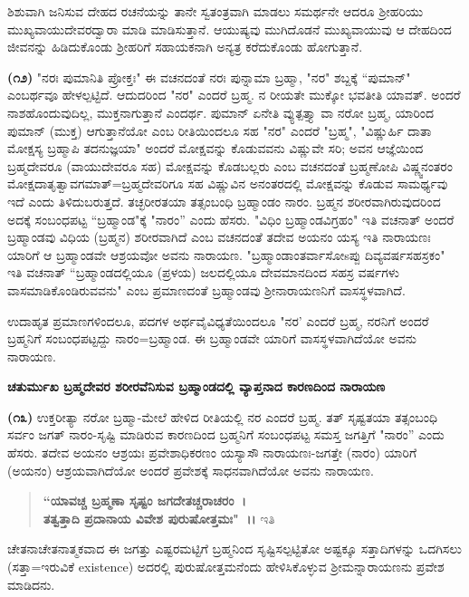 
\noindent
ಶಿಶುವಾಗಿ ಜನಿಸುವ ದೇಹದ ರಚನೆಯನ್ನು ತಾನೇ ಸ್ವತಂತ್ರವಾಗಿ ಮಾಡಲು ಸಮರ್ಥನೇ ಆದರೂ ಶ‍್ರೀಹರಿಯು ಮುಖ್ಯವಾಯುದೇವರದ್ವಾರಾ ಮಾಡಿ ಮಾಡಿಸುತ್ತಾನೆ. ಆಯುಷ್ಯವು ಮುಗಿದೊಡನೆ ಮುಖ್ಯವಾಯುವು ಆ ದೇಹದಿಂದ ಜೀವನನ್ನು ಹಿಡಿದುಕೊಂಡು ಶ‍್ರೀಹರಿಗೆ ಸಹಾಯಕನಾಗಿ ಅನ್ಯತ್ರ ಕರೆದುಕೊಂಡು ಹೋಗುತ್ತಾನೆ.

\textbf{(೧೨)} "ನರಃ ಪುಮಾನಿತಿ ಪ್ರೋಕ್ತಃ" ಈ ವಚನದಂತೆ ನರಃ ಪುನ್ನಾಮಾ ಬ್ರಹ್ಮಾ, "ನರ" ಶಬ್ದಕ್ಕೆ “ಪುಮಾನ್" ಎಂಬರ್ಥವೂ ಹೇಳಲ್ಪಟ್ಟಿದೆ. ಆದುದರಿಂದ "ನರ" ಎಂದರೆ ಬ್ರಹ್ಮ. ನ ರೀಯತೇ ಮುಕ್ಕೋ ಭವತೀತಿ ಯಾವತ್. ಅಂದರೆ ನಾಶಹೊಂದುವುದಿಲ್ಲ, ಮುಕ್ತನಾಗುತ್ತಾನೆ ಎಂದರ್ಥ. ಪುಮಾನ್ ಏನೇತಿ ವ್ಯುತ್ಪತ್ತ್ಯಾ ವಾ ನರೋ ಬ್ರಹ್ಮ, ಯಾರಿಂದ ಪುಮಾನ್ (ಮುಕ್ತ) ಆಗುತ್ತಾನೆಯೋ ಎಂಬ ರೀತಿಯಿಂದಲೂ ಸಹ "ನರ" ಎಂದರೆ "ಬ್ರಹ್ಮ", "ವಿಷ್ಣುರ್ಹಿ ದಾತಾ ಮೋಕ್ಷಸ್ಯ ಬ್ರಹ್ಮಾಪಿ ತದನುಜ್ಞಯಾ" ಅಂದರೆ ಮೋಕ್ಷವನ್ನು ಕೊಡುವವನು ವಿಷ್ಣುವೇ ಸರಿ; ಅವನ ಆಜ್ಞೆಯಿಂದ ಬ್ರಹ್ಮದೇವರೂ (ವಾಯುದೇವರೂ ಸಹ) ಮೋಕ್ಷವನ್ನು ಕೊಡಬಲ್ಲರು ಎಂಬ ವಚನದಂತೆ ಬ್ರಹ್ಮಣೋಪಿ ವಿಷ್ಣ್ವನಂತರಂ ಮೋಕ್ಷದಾತೃತ್ವಾವಗಮಾತ್=ಬ್ರಹ್ಮದೇವರಿಗೂ ಸಹ ವಿಷ್ಣುವಿನ ಅನಂತರದಲ್ಲಿ ಮೋಕ್ಷವನ್ನು ಕೊಡುವ ಸಾಮರ್ಥ್ಯವು ಇದೆ ಎಂದು ತಿಳಿದುಬರುತ್ತದೆ. ತಚ್ಛರೀರತಯಾ ತತ್ಸಂಬಂಧಿ ಬ್ರಹ್ಮಾಂಡಂ ನಾರಂ. ಬ್ರಹ್ಮನ ಶರೀರವಾಗಿರುವುದರಿಂದ ಅದಕ್ಕೆ ಸಂಬಂಧಪಟ್ಟ “ಬ್ರಹ್ಮಾಂಡ"ಕ್ಕೆ "ನಾರಂ'' ಎಂದು ಹೆಸರು. "ವಿಧಿಂ ಬ್ರಹ್ಮಾಂಡವಿಗ್ರಹಂ" ಇತಿ ವಚನಾತ್ ಅಂದರೆ ಬ್ರಹ್ಮಾಂಡವು ವಿಧಿಯ (ಬ್ರಹ್ಮನ) ಶರೀರವಾಗಿದೆ ಎಂಬ ವಚನದಂತೆ ತದೇವ ಅಯನಂ ಯಸ್ಯ ಇತಿ ನಾರಾಯಣಃ ಯಾರಿಗೆ ಆ ಬ್ರಹ್ಮಾಂಡವೇ ಆಶ್ರಯವೋ ಅವನು ನಾರಾಯಣ. "ಬ್ರಹ್ಮಾಂಡಾಂತ\-ರ್ವಾಸೋsಪ್ಪು ದಿವ್ಯವರ್ಷಸಹಸ್ರಕಂ" ಇತಿ ವಚನಾತ್ “ಬ್ರಹ್ಮಾಂಡದಲ್ಲಿಯೂ (ಪ್ರಳಯ) ಜಲದಲ್ಲಿಯೂ ದೇವಮಾನದಿಂದ ಸಹಸ್ರ ವರ್ಷಗಳು ವಾಸಮಾಡಿಕೊಂಡಿರುವವನು" ಎಂಬ ಪ್ರಮಾಣದಂತೆ ಬ್ರಹ್ಮಾಂಡವು ಶ‍್ರೀನಾರಾಯಣನಿಗೆ ವಾಸಸ್ಥಳವಾಗಿದೆ.

ಉದಾಹೃತ ಪ್ರಮಾಣಗಳಿಂದಲೂ, ಪದಗಳ ಅರ್ಥವೈವಿಧ್ಯತೆಯಿಂದಲೂ "ನರ' ಎಂದರೆ ಬ್ರಹ್ಮ, ನರನಿಗೆ ಅಂದರೆ ಬ್ರಹ್ಮನಿಗೆ ಸಂಬಂಧಪಟ್ಟದ್ದು ನಾರಂ=ಬ್ರಹ್ಮಾಂಡ. ಈ ಬ್ರಹ್ಮಾಂಡವೇ ಯಾರಿಗೆ ವಾಸಸ್ಥಳವಾಗಿದೆಯೋ ಅವನು ನಾರಾಯಣ.

\begin{center}
\textbf{ಚತುರ್ಮುಖ ಬ್ರಹ್ಮದೇವರ ಶರೀರವೆನಿಸುವ ಬ್ರಹ್ಮಾಂಡದಲ್ಲಿ ವ್ಯಾಪ್ತನಾದ ಕಾರಣದಿಂದ ನಾರಾಯಣ}
\end{center}

\textbf{(೧೩)} ಉಕ್ತರೀತ್ಯಾ ನರೋ ಬ್ರಹ್ಮಾ-ಮೇಲೆ ಹೇಳಿದ ರೀತಿಯಲ್ಲಿ ನರ ಎಂದರೆ ಬ್ರಹ್ಮ. ತತ್ ಸೃಷ್ಟತಯಾ ತತ್ಸಂಬಂಧಿ ಸರ್ವಂ ಜಗತ್ ನಾರಂ-ಸೃಷ್ಟಿ ಮಾಡಿರುವ ಕಾರಣದಿಂದ ಬ್ರಹ್ಮನಿಗೆ ಸಂಬಂಧಪಟ್ಟ ಸಮಸ್ತ ಜಗತ್ತಿಗೆ "ನಾರಂ'' ಎಂದು ಹೆಸರು. ತದೇವ ಅಯನಂ ಆಶ್ರಯಃ ಪ್ರವೇಶಾಧಿಕರಣಂ ಯಸ್ಯಾಸೌ ನಾರಾಯಣಃ-ಜಗತ್ತೇ (ನಾರಂ) ಯಾರಿಗೆ (ಅಯನಂ) ಆಶ್ರಯವಾಗಿದೆಯೋ ಅಂದರೆ ಪ್ರವೇಶಕ್ಕೆ ಸಾಧನವಾಗಿದೆಯೋ ಅವನು ನಾರಾಯಣ.

\begin{verse}
 \textbf{“ಯಾವಚ್ಚ ಬ್ರಹ್ಮಣಾ ಸೃಷ್ಟಂ ಜಗದೇತಚ್ಚರಾಚರಂ~।}\\\textbf{ತತ್ವತ್ತಾದಿ ಪ್ರದಾನಾಯ ವಿವೇಶ ಪುರುಷೋತ್ತಮಃ"~।।} ಇತಿ 
\end{verse}

\noindent
ಚೇತನಾಚೇತನಾತ್ಮಕವಾದ ಈ ಜಗತ್ತು ಎಷ್ಟರಮಟ್ಟಿಗೆ ಬ್ರಹ್ಮನಿಂದ ಸೃಷ್ಟಿಸಲ್ಪಟ್ಟಿತೋ ಅಷ್ಟಕ್ಕೂ ಸತ್ತಾದಿಗಳನ್ನು ಒದಗಿಸಲು (ಸತ್ತಾ=ಇರುವಿಕೆ existence) ಅದರಲ್ಲಿ ಪುರುಷೋತ್ತಮನೆಂದು ಹೇಳಿಸಿಕೊಳ್ಳುವ ಶ‍್ರೀಮನ್ನಾರಾಯಣನು ಪ್ರವೇಶ ಮಾಡಿದನು.

